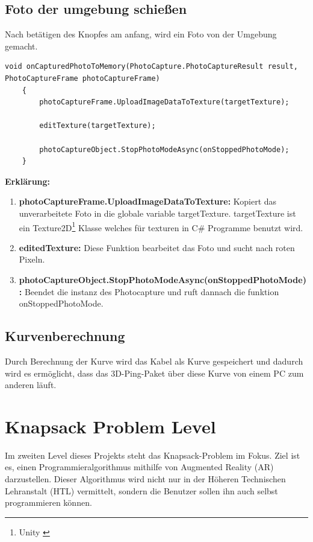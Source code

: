 \subsection*{Foto der umgebung schießen}
Nach betätigen des Knopfes am anfang, wird ein Foto von der Umgebung gemacht.
\begin{lstlisting}[style=csharp, caption={}, label=code:onCapturedPhotoToMemory]
void onCapturedPhotoToMemory(PhotoCapture.PhotoCaptureResult result, PhotoCaptureFrame photoCaptureFrame)
    {
        photoCaptureFrame.UploadImageDataToTexture(targetTexture);

        editTexture(targetTexture);

        photoCaptureObject.StopPhotoModeAsync(onStoppedPhotoMode);
    }
\end{lstlisting}
\textbf{Erklärung:}
\begin{enumerate}
    \item \textbf{photoCaptureFrame.UploadImageDataToTexture:} Kopiert das unverarbeitete Foto in die globale variable targetTexture. targetTexture ist ein Texture2D\footnote{Unity \cite{Texture2D}} Klasse welches für texturen in C# Programme benutzt wird.
    \item \textbf{editedTexture:} Diese Funktion bearbeitet das Foto und sucht nach roten Pixeln.
    \item \textbf{photoCaptureObject.StopPhotoModeAsync(onStoppedPhotoMode):} Beendet die instanz des Photocapture und ruft dannach die funktion onStoppedPhotoMode.
\end{enumerate}




\subsection{Kurvenberechnung}
Durch Berechnung der Kurve wird das Kabel als Kurve gespeichert
und dadurch wird es ermöglicht, dass das 3D-Ping-Paket über diese
Kurve von einem PC zum anderen läuft.


\section{Knapsack Problem Level}
Im zweiten Level dieses Projekts steht das Knapsack-Problem im Fokus.
Ziel ist es, einen Programmieralgorithmus mithilfe von Augmented Reality
(AR) darzustellen. Dieser Algorithmus wird nicht nur in der Höheren
Technischen Lehranstalt (HTL) vermittelt, sondern die Benutzer sollen
ihn auch selbst programmieren können.

